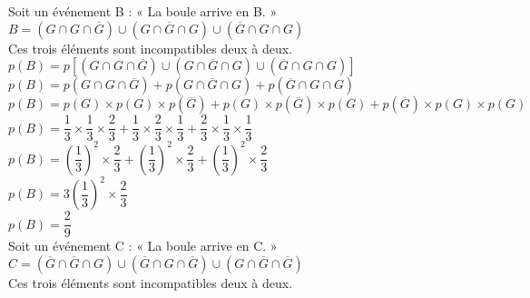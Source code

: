 \newpage

Soit un événement B : « La boule arrive en B. » \\

$ B = \left( G \cap G \cap \overline{G} \right) \cup \left( G \cap \overline{G} \cap G \right) \cup \left( \overline{G} \cap G \cap G \right) $ \\

Ces trois éléments sont incompatibles deux à deux. \\

$ p\left(B\right) = p\left[\left( G \cap G \cap \overline{G} \right) \cup \left( G \cap \overline{G} \cap G \right) \cup \left( \overline{G} \cap G \cap G \right)\right] $ \\

$ p\left(B\right) = p\left( G \cap G \cap \overline{G} \right) +  p\left( G \cap \overline{G} \cap G \right) +  p\left( \overline{G} \cap G \cap G \right) $ \\

$ p\left(B\right) = p\left(G\right) \times p\left(G\right) \times p\left(\overline{G}\right) + p\left(G\right) \times p\left(\overline{G}\right) \times p\left(G\right) + p\left(\overline{G}\right) \times p\left(G\right) \times p\left(G\right) $ \\

$ p\left(B\right) = \dfrac{1}{3} \times \dfrac{1}{3} \times \dfrac{2}{3} +  \dfrac{1}{3} \times \dfrac{2}{3} \times \dfrac{1}{3} +  \dfrac{2}{3} \times \dfrac{1}{3} \times \dfrac{1}{3} $ \\

$ p\left(B\right) = \left(\dfrac{1}{3}\right)^2 \times \dfrac{2}{3} +  \left(\dfrac{1}{3}\right)^2 \times \dfrac{2}{3} +  \left(\dfrac{1}{3}\right)^2 \times \dfrac{2}{3} $ \\

$ p\left(B\right) = 3\left(\dfrac{1}{3}\right)^2 \times \dfrac{2}{3} $ \\

$ p\left(B\right) = \dfrac{2}{9} $ \\

Soit un événement C : « La boule arrive en C. » \\

$ C = \left( \overline{G} \cap  \overline{G} \cap G \right) \cup \left( \overline{G} \cap G \cap \overline{G} \right) \cup \left( G \cap \overline{G} \cap \overline{G} \right) $ \\

Ces trois éléments sont incompatibles deux à deux. \\

